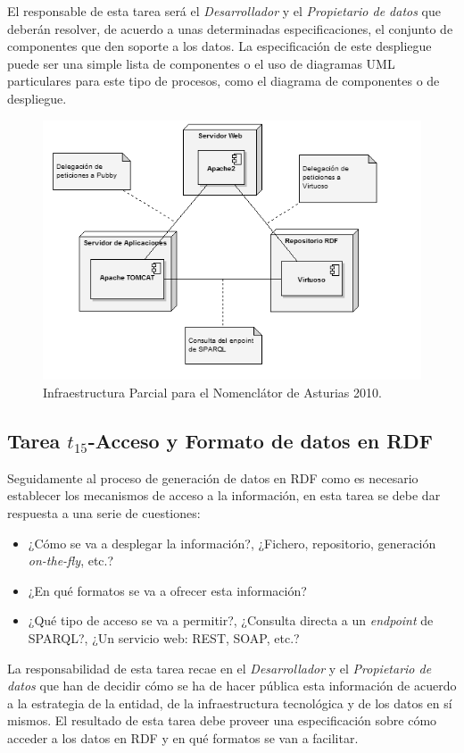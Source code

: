 El responsable de esta tarea será el \textit{Desarrollador} y el \textit{Propietario de datos} que deberán
resolver, de acuerdo a unas determinadas especificaciones, el conjunto de componentes que den soporte a los datos. La especificación
de este despliegue puede ser una simple lista de componentes o el uso de diagramas UML particulares
para este tipo de procesos, como el diagrama de componentes o de despliegue.

\begin{figure}[!htb]
\centering
	\includegraphics[width=12cm]{images/phd/infra-ld}
\caption{Infraestructura Parcial para el Nomenclátor de Asturias 2010.}
\label{fig:deploy-nomenclator}
\end{figure}

\subsection{Tarea $t_{15}$-Acceso y Formato de datos en RDF}
Seguidamente al proceso de generación de datos en RDF como \linkeddata es necesario establecer
los mecanismos de acceso a la información, en esta tarea se debe dar respuesta a una
serie de cuestiones:
\begin{itemize}
 \item ¿Cómo se va a desplegar la información?, ¿Fichero, repositorio, generación \textit{on-the-fly}, etc.?
 \item ¿En qué formatos se va a ofrecer esta información?
 \item ¿Qué tipo de acceso se va a permitir?, ¿Consulta directa a un \textit{endpoint} de \gls{SPARQL}?, ¿Un servicio web: \gls{REST}, \gls{SOAP}, etc.?
\end{itemize}

La responsabilidad de esta tarea recae en el \textit{Desarrollador} y el \textit{Propietario de datos} que han de decidir 
cómo se ha de hacer pública esta información de acuerdo a la estrategia de la entidad, de la infraestructura tecnológica y de los datos en sí mismos. 
El resultado de esta tarea debe proveer una especificación sobre cómo acceder a los datos en RDF y en qué formatos se van a facilitar.

